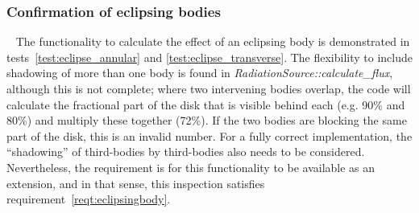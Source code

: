 \subsubsection{Confirmation of eclipsing bodies}
\ \newline
\label{inspect:eclipsingbody}
The functionality to calculate the effect of an eclipsing body is demonstrated in tests~\vref{test:eclipse_annular} and \vref{test:eclipse_transverse}.  The flexibility to include shadowing of more than one body is found in \textit{RadiationSource::calculate\_flux}, although this is not complete;  where two intervening bodies overlap, the code will calculate the fractional part of the disk that is visible behind each (e.g. 90\% and 80\%) and multiply these together (72\%).  If the two bodies are blocking the same part of the disk, this is an invalid number.  For a fully correct implementation, the ``shadowing'' of third-bodies by third-bodies also needs to be considered.  Nevertheless, the requirement is for this functionality to be available as an extension, and in that sense, this inspection satisfies requirement~\ref{reqt:eclipsingbody}.
